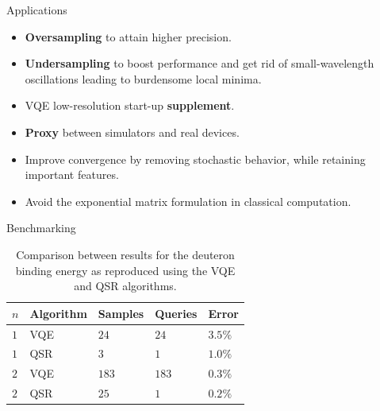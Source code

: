 \documentclass[final]{beamer}
\newlength{\onecolwid}
\begin{document}
\begin{frame}[t]
\begin{columns}[t]
\begin{column}{\onecolwid}
\begin{block}{Applications}

  \begin{itemize}
    \item \textbf{Oversampling} to attain higher precision.
    \item \textbf{Undersampling} to boost performance and get rid of small-wavelength oscillations leading to burdensome local minima.
    \item VQE low-resolution start-up \textbf{supplement}.
    \item \textbf{Proxy} between simulators and real devices.
    \item Improve convergence by removing stochastic behavior, while retaining important features.
    \item Avoid the exponential matrix formulation in classical computation.
  \end{itemize}

\end{block}


\begin{block}{Benchmarking}

  \vspace{-1em}
  \begin{table}[!bp]
  \caption{Comparison between results for the deuteron binding energy as reproduced using the VQE and QSR algorithms.\label{tab:vqe-qsr-comparison}}
    \bgroup
    \def\arraystretch{1.1}
    \setlength\tabcolsep{0.8em}
    \begin{tabular}{l l l l l}
    \toprule
    \toprule
    $n$ & Algorithm & Samples & Queries & Error \\
    \midrule
    $1$ & VQE & $24$ & $24$ & $3.5\%$ \\
    $1$ & QSR & $3$ & $1$ & $1.0\%$
  	\vspace{0.4em} \\
    $2$ & VQE & $183$ & $183$ & $0.3\%$ \\
    $2$ & QSR & $25$ & $1$ & $0.2\%$ \\
    \bottomrule
    \bottomrule
    \end{tabular}
    \egroup
  \end{table}

\end{block}


\end{column}
\end{columns}
\end{frame}
\end{document}
